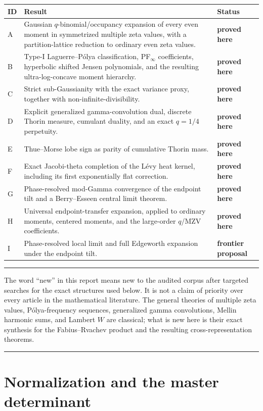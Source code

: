 \documentclass[11pt,oneside]{article}
\theoremstyle{definition}
\theoremstyle{remark}
\newcommand{\statusproved}{\textcolor{provedgreen}{\textbf{proved here}}}
\newcommand{\statusfrontier}{\textcolor{cautionorange}{\textbf{frontier proposal}}}
\newenvironment{boxedremark}{%
  \par\smallskip\noindent\begin{center}\begin{minipage}{0.94\textwidth}%
  \color{black}\hrule\vspace{0.6em}\small
}{%
  \vspace{0.6em}\hrule\end{minipage}\end{center}\smallskip
}
\begin{document}
\begin{longtable}{@{}p{}p{}p{}@{}}
\toprule
ID & Result & Status\\
\midrule
\endhead
A & Gaussian $q$-binomial/occupancy expansion of every even moment in
    symmetrized multiple zeta values, with a partition-lattice reduction to
    ordinary even zeta values. & \statusproved\\
B & Type-I Laguerre--P\'olya classification, PF$_\infty$ coefficients,
    hyperbolic shifted Jensen polynomials, and the resulting ultra-log-concave
    moment hierarchy. & \statusproved\\
C & Strict sub-Gaussianity with the exact variance proxy, together with
    non-infinite-divisibility. & \statusproved\\
D & Explicit generalized gamma-convolution dual, discrete Thorin measure,
    cumulant duality, and an exact $q=1/4$ perpetuity. & \statusproved\\
E & Thue--Morse lobe sign as parity of cumulative Thorin mass. & \statusproved\\
F & Exact Jacobi-theta completion of the L\'evy heat kernel, including its
    first exponentially flat correction. & \statusproved\\
G & Phase-resolved mod-Gamma convergence of the endpoint tilt and a
    Berry--Esseen central limit theorem. & \statusproved\\
H & Universal endpoint-transfer expansion, applied to ordinary moments,
    centered moments, and the large-order $q$/MZV coefficients. & \statusproved\\
I & Phase-resolved local limit and full Edgeworth expansion under the endpoint
    tilt. & \statusfrontier\\
\bottomrule
\end{longtable}

\begin{boxedremark}
The word ``new'' in this report means new to the audited corpus after targeted
searches for the exact structures used below.  It is not a claim of priority
over every article in the mathematical literature.  The general theories of
multiple zeta values, P\'olya-frequency sequences, generalized gamma
convolutions, Mellin harmonic sums, and Lambert $W$ are classical; what is new
here is their exact synthesis for the Fabius--Rvachev product and the resulting
cross-representation theorems.
\end{boxedremark}

\section{Normalization and the master determinant}
\end{document}
